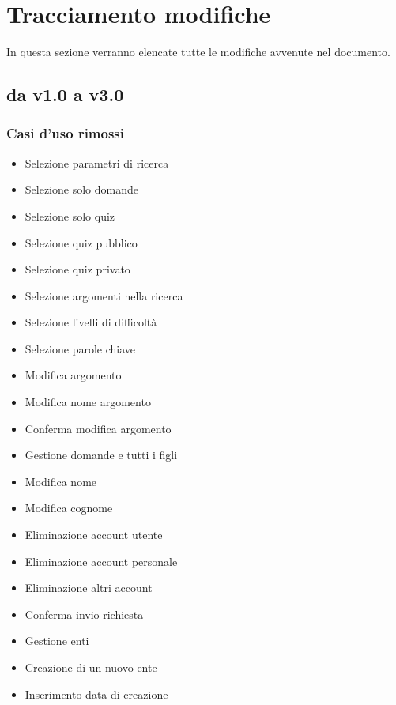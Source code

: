 \section{Tracciamento modifiche}
In questa sezione verranno elencate tutte le modifiche avvenute nel documento.

\subsection{da v1.0 a v3.0}
\subsubsection{Casi d'uso rimossi}
\begin{itemize}
	\item {} Selezione parametri di ricerca 
	\item {} Selezione solo domande
	\item {} Selezione solo quiz
	\item {} Selezione quiz pubblico
	\item {} Selezione quiz privato
	\item {} Selezione argomenti nella ricerca
	\item {} Selezione livelli di difficoltà
	\item {} Selezione parole chiave
	\item {} Modifica argomento
	\item {} Modifica nome argomento 
	\item {} Conferma modifica argomento
	\item {} Gestione domande e tutti i figli
	\item {} Modifica nome
	\item {} Modifica cognome
	\item {} Eliminazione account utente
	\item {} Eliminazione account personale
	\item {} Eliminazione altri account
	\item {} Conferma invio richiesta 
	\item {} Gestione enti 
	\item {} Creazione di un nuovo ente
	\item {} Inserimento data di creazione 

\end{itemize}
